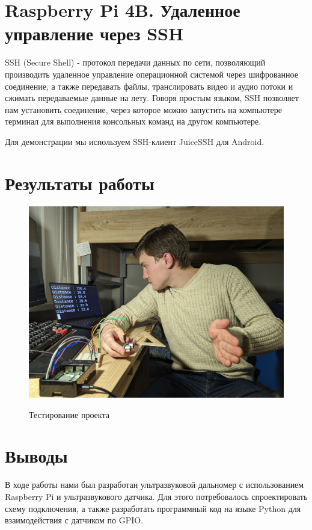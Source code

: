 \documentclass[a4paper, 14pt]{article}
\begin{document}
\section{Raspberry Pi 4B. Удаленное управление через SSH}

SSH (Secure Shell) - протокол передачи данных по сети, позволяющий производить удаленное управление операционной системой через шифрованное соединение, а также передавать файлы, транслировать видео и аудио потоки и сжимать передаваемые данные на лету. Говоря простым языком, SSH позволяет нам установить соединение, через которое можно запустить на компьютере терминал для выполнения консольных команд на другом компьютере.

Для демонстрации мы используем SSH-клиент JuiceSSH для Android.

\newpage
\section{Результаты работы}

\begin{figure}[H]
	\centering
	\includegraphics[width=15cm]{screenshots/12.png}\\
	\caption{Тестирование проекта}
\end{figure}


\newpage
\section{Выводы}

В ходе работы нами был разработан ультразвуковой дальномер с использованием Raspberry Pi и ультразвукового датчика. Для этого потребовалось спроектировать схему подключения, а также разработать программный код на языке Python для взаимодействия с датчиком по GPIO.
\end{document}
